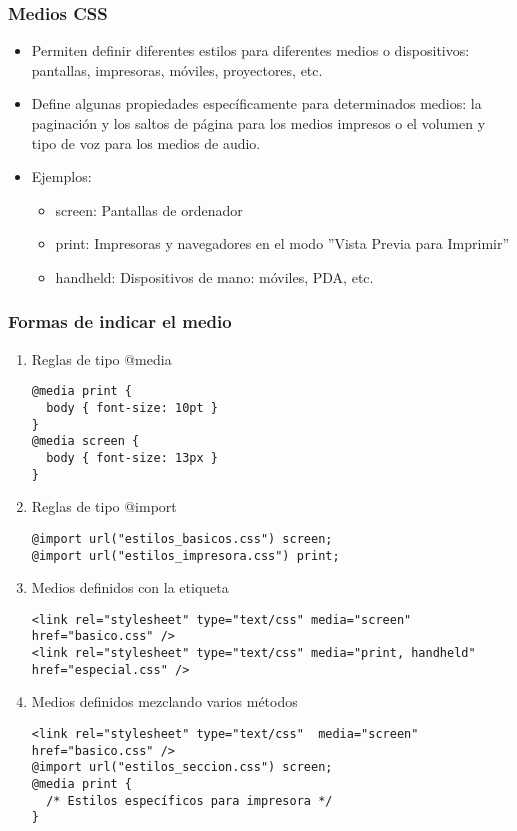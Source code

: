 \begin{frame}
\frametitle{Medios CSS}

\begin{itemize}
  \item Permiten definir diferentes estilos para diferentes medios o dispositivos: pantallas, impresoras, móviles, proyectores, etc.
  \item Define algunas propiedades específicamente para determinados medios: la paginación y los saltos de página para los medios impresos o el volumen y tipo de voz para los medios de audio.
  \item Ejemplos:
  \begin{itemize}
    \item screen: Pantallas de ordenador
    \item print: Impresoras y navegadores en el modo ''Vista Previa para Imprimir''
    \item handheld:	Dispositivos de mano: móviles, PDA, etc.
  \end{itemize}
\end{itemize}

\end{frame}


\begin{frame}[fragile]
\frametitle{Formas de indicar el medio}

\begin{enumerate}
  \item Reglas de tipo @media
{\footnotesize
    \begin{verbatim}
@media print {
  body { font-size: 10pt }
}
@media screen {
  body { font-size: 13px }
}
    \end{verbatim}
}
  \item Reglas de tipo @import
{\footnotesize
    \begin{verbatim}
@import url("estilos_basicos.css") screen;
@import url("estilos_impresora.css") print;
    \end{verbatim}
}
  \item Medios definidos con la etiqueta
{\footnotesize
    \begin{verbatim}
<link rel="stylesheet" type="text/css" media="screen" href="basico.css" />
<link rel="stylesheet" type="text/css" media="print, handheld" href="especial.css" />
    \end{verbatim}
}
  \item Medios definidos mezclando varios métodos
{\footnotesize
    \begin{verbatim}
<link rel="stylesheet" type="text/css"  media="screen" href="basico.css" />
@import url("estilos_seccion.css") screen;
@media print {
  /* Estilos específicos para impresora */
}
    \end{verbatim}
}
\end{enumerate}

\end{frame}

